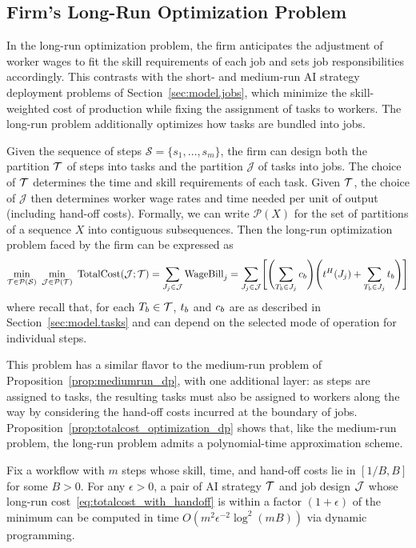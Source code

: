\subsection{Firm's Long-Run Optimization Problem}
\label{app:jobdesign.longrun}

In the long-run optimization problem, the firm anticipates the adjustment of worker wages to fit the skill requirements of each job and sets job responsibilities accordingly.
This contrasts with the short- and medium-run AI strategy deployment problems of Section~\ref{sec:model.jobs}, which minimize the skill-weighted cost of production while fixing the assignment of tasks to workers. 
The long-run problem additionally optimizes how tasks are bundled into jobs.

Given the sequence of steps $\mathcal{S} = \{s_1, \dotsc, s_m\}$, the firm can design both the partition $\mathcal{T}$ of steps into tasks and the partition $\mathcal{J}$ of tasks into jobs.
The choice of $\mathcal{T}$ determines the time and skill requirements of each task.
Given $\mathcal{T}$, the choice of $\mathcal{J}$ then determines worker wage rates and time needed per unit of output (including hand-off costs).
Formally, we can write $\mathcal{P}(X)$ for the set of partitions of a sequence $X$ into contiguous subsequences.  Then the long-run optimization problem faced by the firm can be expressed as
\begin{align}
\label{eq:totalcost_with_handoff}
\min_{\T \in \mathcal{P}(\mathcal{S})} \
\min_{\mathcal{J} \in \mathcal{P}(\T)} \ 
\text{TotalCost}(\mathcal{J}; \T) 
= \sum_{J_j \in \mathcal{J}} \text{WageBill}_j = 
\sum_{J_j \in \mathcal{J}} \Biggl[\Biggl(\sum_{T_b \in J_j} \skillcost{b} \Biggr) \Biggl(\handofftime{}(J_j) + \sum_{T_b \in J_j} \timecost{b} \Biggr)\Biggr]
\end{align}
where recall that, for each $T_b \in \mathcal{T}$, $t_{b}$ and $c_{b}$ are as described in Section~\ref{sec:model.tasks} and can depend on the selected mode of operation for individual steps.

This problem has a similar flavor to the medium-run problem of Proposition~\ref{prop:mediumrun_dp}, with one additional layer: as steps are assigned to tasks, the resulting tasks must also be assigned to workers along the way by considering the hand-off costs incurred at the boundary of jobs.
Proposition~\ref{prop:totalcost_optimization_dp} shows that, like the medium-run problem, the long-run problem admits a polynomial-time approximation scheme.

\begin{proposition}
\label{prop:totalcost_optimization_dp}
Fix a workflow with $m$ steps whose skill, time, and hand-off costs lie in $[1/B, B]$ for some $B > 0$.
For any $\epsilon > 0$, a pair of AI strategy $\mathcal{T}$ and job design $\mathcal{J}$ whose long-run cost~\eqref{eq:totalcost_with_handoff} is within a factor $(1+\epsilon)$ of the minimum can be computed in time $O(m^2 \epsilon^{-2} \log^2(mB))$ via dynamic programming.
\end{proposition}

